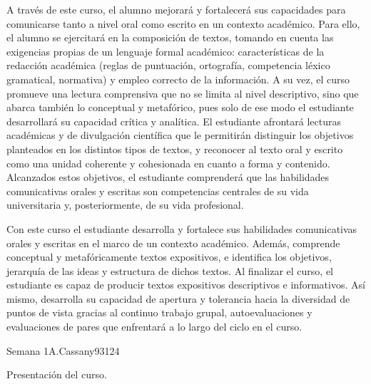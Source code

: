 \begin{syllabus}


\begin{justification}
A través de este curso, el alumno mejorará y fortalecerá sus capacidades para comunicarse tanto a nivel oral como escrito en un contexto académico. Para ello, el alumno se ejercitará en la composición de textos, tomando en cuenta las exigencias propias de un lenguaje formal académico: características de la redacción académica (reglas de puntuación, ortografía, competencia léxico gramatical, normativa) y empleo correcto de la información. A su vez, el curso promueve una lectura comprensiva que no se limita al nivel descriptivo, sino que abarca también lo conceptual y metafórico, pues solo de ese modo el estudiante desarrollará su capacidad crítica y analítica. El estudiante afrontará lecturas académicas y de divulgación científica que le permitirán distinguir los objetivos planteados en los distintos tipos de textos, y reconocer al texto oral y escrito como una unidad coherente y cohesionada en cuanto a forma y contenido. Alcanzados estos objetivos, el estudiante comprenderá que las habilidades comunicativas orales y escritas son competencias centrales de su vida universitaria y, posteriormente, de su vida profesional. 
\end{justification}

\begin{goals}
\item Con este curso el estudiante desarrolla y fortalece sus habilidades comunicativas orales y escritas en el marco de un contexto académico. Además, comprende conceptual y metafóricamente textos expositivos, e identifica los objetivos, jerarquía de las ideas y estructura de dichos textos. Al finalizar el curso, el estudiante es capaz de producir textos expositivos descriptivos e informativos. Así mismo, desarrolla su capacidad de apertura y tolerancia hacia la diversidad de puntos de vista gracias al continuo trabajo grupal, autoevaluaciones y evaluaciones de pares que enfrentará a lo largo del ciclo en el curso. 
\end{goals}

\begin{outcomes}   
\end{outcomes}

\begin{unit}{Semana 1A.}{Cassany93}{12}{4}
   \begin{topics}
      \item Presentación del curso.
   \end{topics}
   \begin{learningoutcomes}
      \item
   \end{learningoutcomes}
\end{unit}


\end{syllabus}
